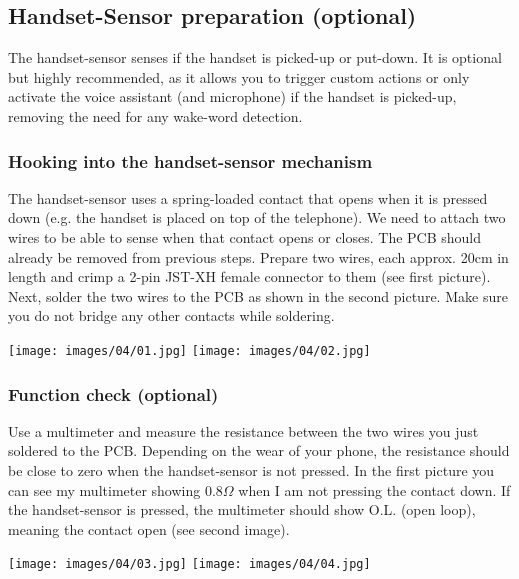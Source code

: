 \documentclass[]{article}
\begin{document}
\subsection{Handset-Sensor preparation (optional)}
The handset-sensor senses if the handset is picked-up or put-down. It is optional but highly recommended, as it allows you to trigger custom actions or only activate the voice assistant (and microphone) if the handset is picked-up, removing the need for any wake-word detection.
\subsubsection{Hooking into the handset-sensor mechanism}
\begin{minipage}[t]{0.4\linewidth}
	\vspace{0pt}
	The handset-sensor uses a spring-loaded contact that opens when it is pressed down (e.g. the handset is placed on top of the telephone). We need to attach two wires to be able to sense when that contact opens or closes. The PCB should already be removed from previous steps.
	\newline
	\newline
	Prepare two wires, each approx. 20cm in length and crimp a 2-pin JST-XH female connector to them (see first picture).
	\newline
	\newline
	Next, solder the two wires to the PCB as shown in the second picture. Make sure you do not bridge any other contacts while soldering. 
\end{minipage}
\hfill
\begin{minipage}[t]{0.5\linewidth}
	\vspace{0pt}
	\texttt{[image: images/04/01.jpg]}
	\texttt{[image: images/04/02.jpg]}
\end{minipage}

\subsubsection{Function check (optional)}
\begin{minipage}[t]{0.4\linewidth}
	\vspace{0pt}
	Use a multimeter and measure the resistance between the two wires you just soldered to the PCB.
	\newline
	\newline
	Depending on the wear of your phone, the resistance should be close to zero when the handset-sensor is not pressed. In the first picture you can see my multimeter showing $0.8 \Omega$ when I am not pressing the contact down.
	\newline
	\newline
	If the handset-sensor is pressed, the multimeter should show O.L. (open loop), meaning the contact open (see second image).
\end{minipage}
\hfill
\begin{minipage}[t]{0.5\linewidth}
	\vspace{0pt}
	\texttt{[image: images/04/03.jpg]}
	\texttt{[image: images/04/04.jpg]}
\end{minipage}
\end{document}
